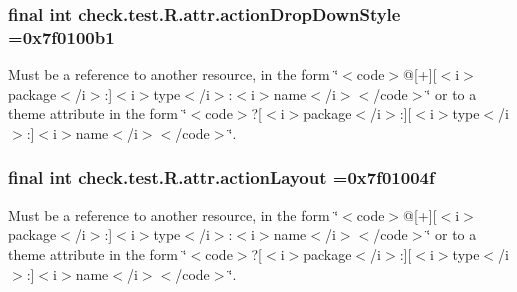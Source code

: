 \subsubsection[{action\+Drop\+Down\+Style}]{\setlength{\rightskip}{0pt plus 5cm}final int check.\+test.\+R.\+attr.\+action\+Drop\+Down\+Style =0x7f0100b1\hspace{0.3cm}{\ttfamily [static]}}\label{classcheck_1_1test_1_1_r_1_1attr_a45269834542ea70d42dc68393312c539}
Must be a reference to another resource, in the form \char`\"{}$<$code$>$@\mbox{[}+\mbox{]}\mbox{[}$<$i$>$package$<$/i$>$\+:\mbox{]}$<$i$>$type$<$/i$>$\+:$<$i$>$name$<$/i$>$$<$/code$>$\char`\"{} or to a theme attribute in the form \char`\"{}$<$code$>$?\mbox{[}$<$i$>$package$<$/i$>$\+:\mbox{]}\mbox{[}$<$i$>$type$<$/i$>$\+:\mbox{]}$<$i$>$name$<$/i$>$$<$/code$>$\char`\"{}. \hypertarget{classcheck_1_1test_1_1_r_1_1attr_ab4b527b5796f4512de117247dbd35351}{}
\subsubsection[{action\+Layout}]{\setlength{\rightskip}{0pt plus 5cm}final int check.\+test.\+R.\+attr.\+action\+Layout =0x7f01004f\hspace{0.3cm}{\ttfamily [static]}}\label{classcheck_1_1test_1_1_r_1_1attr_ab4b527b5796f4512de117247dbd35351}
Must be a reference to another resource, in the form \char`\"{}$<$code$>$@\mbox{[}+\mbox{]}\mbox{[}$<$i$>$package$<$/i$>$\+:\mbox{]}$<$i$>$type$<$/i$>$\+:$<$i$>$name$<$/i$>$$<$/code$>$\char`\"{} or to a theme attribute in the form \char`\"{}$<$code$>$?\mbox{[}$<$i$>$package$<$/i$>$\+:\mbox{]}\mbox{[}$<$i$>$type$<$/i$>$\+:\mbox{]}$<$i$>$name$<$/i$>$$<$/code$>$\char`\"{}. \hypertarget{classcheck_1_1test_1_1_r_1_1attr_aeb2f5cb8f87508e1e6720da3ab4010aa}{}
